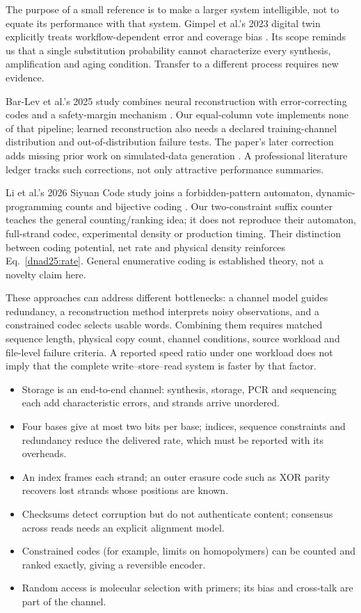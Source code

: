 The purpose of a small reference is to make a larger system intelligible,
not to equate its performance with that system. Gimpel et al.'s 2023 digital
twin explicitly treats workflow-dependent error and coverage bias
\cite{Gimpel2023}. Its scope reminds us that a single substitution probability
cannot characterize every synthesis, amplification and aging condition.
Transfer to a different process requires new evidence.

Bar-Lev et al.'s 2025 study combines neural reconstruction with error-correcting
codes and a safety-margin mechanism \cite{BarLev2025}.
Our equal-column vote implements none of that pipeline; learned reconstruction
also needs a declared training-channel distribution and out-of-distribution
failure tests. The paper's later correction adds missing prior work on
simulated-data generation \cite{BarLev2025}. A professional literature
ledger tracks such corrections, not only attractive performance summaries.

Li et al.'s 2026 Siyuan Code study joins a forbidden-pattern automaton,
dynamic-programming counts and bijective coding \cite{Li2026}.
Our two-constraint suffix counter teaches the general counting/ranking idea;
it does not reproduce their automaton, full-strand codec, experimental density
or production timing. Their distinction between coding potential, net rate
and physical density reinforces Eq.~\ref{dnad25:rate}.
General enumerative coding is established theory, not a novelty claim here.

These approaches can address different bottlenecks: a channel model guides
redundancy, a reconstruction method interprets noisy observations, and a
constrained codec selects usable words. Combining them requires matched
sequence length, physical copy count, channel conditions, source workload
and file-level failure criteria. A reported speed ratio under one workload
does not imply that the complete write--store--read system is faster by
that factor.

\begin{KeyIdeas}
\begin{itemize}\setlength{\itemsep}{2pt}
\item Storage is an end-to-end channel: synthesis, storage, PCR and sequencing
each add characteristic errors, and strands arrive unordered.
\item Four bases give at most two bits per base; indices, sequence constraints
and redundancy reduce the delivered rate, which must be reported with its
overheads.
\item An index frames each strand; an outer erasure code such as XOR parity
recovers lost strands whose positions are known.
\item Checksums detect corruption but do not authenticate content; consensus
across reads needs an explicit alignment model.
\item Constrained codes (for example, limits on homopolymers) can be counted and
ranked exactly, giving a reversible encoder.
\item Random access is molecular selection with primers; its bias and
cross-talk are part of the channel.
\end{itemize}
\end{KeyIdeas}

